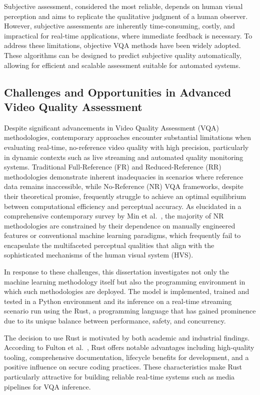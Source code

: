 Subjective assessment, considered the most reliable, depends on human visual perception and aims to replicate the qualitative judgment of a human observer. However, subjective assessments are inherently time-consuming, costly, and impractical for real-time applications, where immediate feedback is necessary. To address these limitations, objective VQA methods have been widely adopted. These algorithms can be designed to predict subjective quality automatically, allowing for efficient and scalable assessment suitable for automated systems.

\subsection{Challenges and Opportunities in Advanced Video Quality Assessment}

Despite significant advancements in Video Quality Assessment (VQA) methodologies, contemporary approaches encounter substantial limitations when evaluating real-time, no-reference video quality with high precision, particularly in dynamic contexts such as live streaming and automated quality monitoring systems. Traditional Full-Reference (FR) and Reduced-Reference (RR) methodologies demonstrate inherent inadequacies in scenarios where reference data remains inaccessible, while No-Reference (NR) VQA frameworks, despite their theoretical promise, frequently struggle to achieve an optimal equilibrium between computational efficiency and perceptual accuracy. As elucidated in a comprehensive contemporary survey by Min et al.~\cite{min2024perceptual}, the majority of NR methodologies are constrained by their dependence on manually engineered features or conventional machine learning paradigms, which frequently fail to encapsulate the multifaceted perceptual qualities that align with the sophisticated mechanisms of the human visual system (HVS).

In response to these challenges, this dissertation investigates not only the machine learning methodology itself but also the programming environment in which such methodologies are deployed. The model is implemented, trained and tested in a Python environment and its inference on a real-time streaming scenario run using the Rust, a programming language that has gained prominence due to its unique balance between performance, safety, and concurrency.

The decision to use Rust is motivated by both academic and industrial findings. According to Fulton et al.~\cite{fulton2022benefits}, Rust offers notable advantages including high-quality tooling, comprehensive documentation, lifecycle benefits for development, and a positive influence on secure coding practices. These characteristics make Rust particularly attractive for building reliable real-time systems such as media pipelines for VQA inference.

